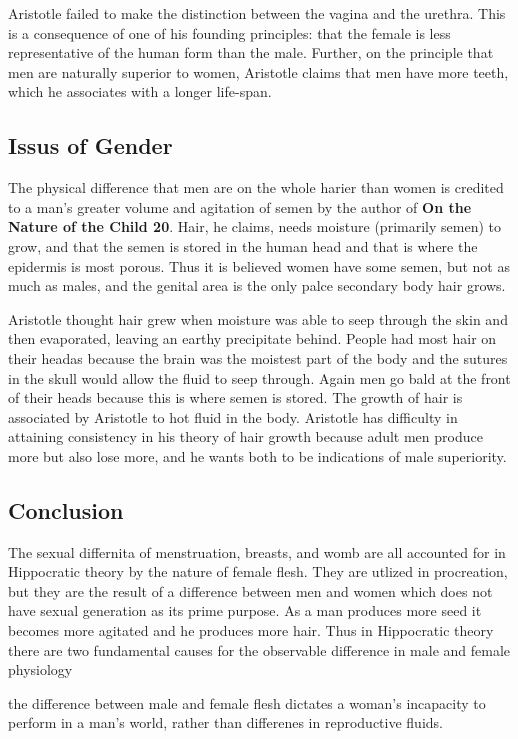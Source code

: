 Aristotle failed to make the distinction between the vagina and the urethra. This is a consequence of one of his founding principles: that the female is less representative of the human form than the male. Further, on the principle that men are naturally superior to women, Aristotle claims that men have more teeth, which he associates with a longer life-span.


\subsection{Issus of Gender}

The physical difference that men are on the whole harier than women is credited to a man's greater volume and agitation of semen by the author of \textbf{On the Nature of the Child 20}. Hair, he claims, needs moisture (primarily semen) to grow, and that the semen is stored in the human head and that is where the epidermis is most porous. Thus it is believed women have some semen, but not as much as males, and the genital area is the only palce secondary body hair grows.

Aristotle thought hair grew when moisture was able to seep through the skin and then evaporated, leaving an earthy precipitate behind. People had most hair on their headas because the brain was the moistest part of the body and the sutures in the skull would allow the fluid to seep through. Again men go bald at the front of their heads because this is where semen is stored. The growth of hair is associated by Aristotle to hot fluid in the body. Aristotle has difficulty in attaining consistency in his theory of hair growth because adult men produce more but also lose more, and he wants both to be indications of male superiority.

\subsection{Conclusion}

The sexual differnita of menstruation, breasts, and womb are all accounted for in Hippocratic theory by the nature of female flesh. They are utlized in procreation, but they are the result of a difference between men and women which does not have sexual generation as its prime purpose. As a man produces more seed it becomes more agitated and he produces more hair. Thus in Hippocratic theory there are two fundamental causes for the observable difference in male and female physiology
\begin{nte}
    the difference between male and female flesh dictates a woman's incapacity to perform in a man's world, rather than differenes in reproductive fluids.
\end{nte}

